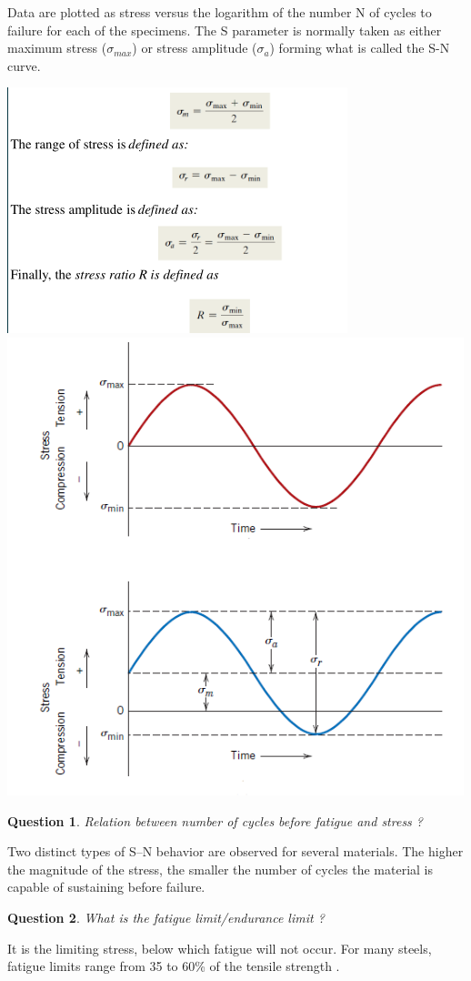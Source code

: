 \documentclass[13]{article}
\newtheorem{exer}{Question}
\begin{document}
Data are plotted as stress versus the logarithm of the number N of cycles to failure for each of the specimens. The S parameter is normally taken as either maximum stress ($\sigma_{max}$) or stress amplitude ($ \sigma_a$) forming what is called the S-N curve.
\begin{center}
\includegraphics[scale=0.5]{figures/35.png} \includegraphics[scale=0.5]{figures/36.png}
\end{center}
\begin{exer}
Relation between number of cycles before fatigue and stress ?
\end{exer}
Two distinct types of S–N behavior are observed for several materials. The higher the magnitude of the stress, the smaller the number of cycles the material is capable of sustaining before failure.
\begin{exer}
What is the fatigue limit/endurance limit ?
\end{exer}
It is the limiting stress, below which fatigue will not occur.
For many steels, fatigue limits range from 35 to 60\% of the tensile strength .
\end{document}
